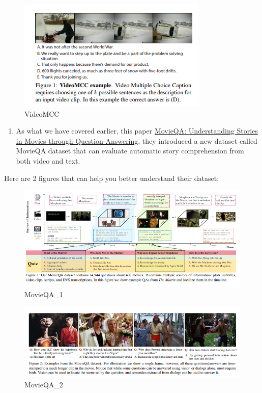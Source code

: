 \documentclass[]{book}
\providecommand{\tightlist}{%
  \setlength{\itemsep}{0pt}\setlength{\parskip}{0pt}}
\theoremstyle{definition}
\theoremstyle{definition}
\theoremstyle{definition}
\theoremstyle{remark}
\begin{document}
\begin{figure}
\centering
\includegraphics{img/mcc.png}
\caption{VideoMCC}
\end{figure}

\begin{enumerate}
\def\labelenumi{\arabic{enumi}.}
\setcounter{enumi}{3}
\tightlist
\item
  As what we have covered earlier, this paper
  \href{https://arxiv.org/pdf/1512.02902.pdf}{MovieQA: Understanding
  Stories in Movies through Question-Answering}, they introduced a new
  dataset called MovieQA dataset that can evaluate automatic story
  comprehension from both video and text.
\end{enumerate}

Here are 2 figures that can help you better understand their dataset:

\begin{figure}
\centering
\includegraphics{img/movieqa1.png}
\caption{MovieQA\_1}
\end{figure}

\begin{figure}
\centering
\includegraphics{img/movieqa2.png}
\caption{MovieQA\_2}
\end{figure}
\end{document}
